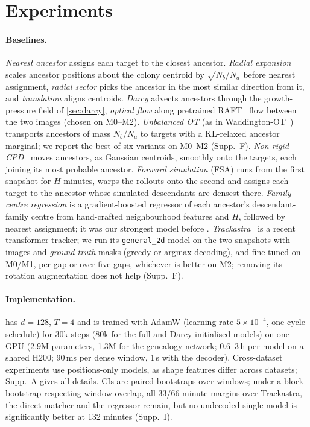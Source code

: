 \section{Experiments}
\label{sec:experiments}

\paragraph{Baselines.}
\emph{Nearest ancestor} assigns each target to the closest ancestor.
\emph{Radial expansion} scales ancestor positions about the colony centroid by $\sqrt{N_b/N_a}$ before nearest assignment, \emph{radial sector} picks the ancestor in the most similar direction from it, and \emph{translation} aligns centroids.
\emph{Darcy} advects ancestors through the growth-pressure field of \cref{sec:darcy}, \emph{optical flow} along pretrained RAFT~\cite{teed2020raft} flow between the two images (chosen on M0--M2).
\emph{Unbalanced OT} (as in Waddington-OT~\cite{schiebinger2019optimal}) transports ancestors of mass $N_b/N_a$ to targets with a KL-relaxed ancestor marginal; we report the best of six variants on M0--M2 (Supp.~F).
\emph{Non-rigid CPD}~\cite{myronenko2010cpd} moves ancestors, as Gaussian centroids, smoothly onto the targets, each joining its most probable ancestor.
\emph{Forward simulation} (FSA) runs \rodsim from the first snapshot for $H$ minutes, warps the rollouts onto the second and assigns each target to the ancestor whose simulated descendants are densest there.
\emph{Family-centre regression} is a gradient-boosted regressor of each ancestor's descendant-family centre from hand-crafted neighbourhood features and $H$, followed by nearest assignment; it was our strongest model before \ours.
\emph{Trackastra}~\cite{gallusser2024trackastra} is a recent transformer tracker; we run its \texttt{general\_2d} model on the two snapshots with images and \emph{ground-truth} masks (greedy or argmax decoding), and fine-tuned on M0/M1, per gap or over five gaps, whichever is better on M2; removing its rotation augmentation does not help (Supp.~F).

\paragraph{Implementation.}
\ours has $d{=}128$, $T{=}4$ and is trained with AdamW (learning rate $5{\times}10^{-4}$, one-cycle schedule) for 30k steps (80k for the full and Darcy-initialised models) on one GPU (2.9M parameters, 1.3M for the genealogy network; 0.6--3\,h per model on a shared H200; 90\,ms per dense window, 1\,s with the decoder).
Cross-dataset experiments use positions-only models, as shape features differ across datasets; Supp.~A gives all details.
CIs are paired bootstraps over windows; under a block bootstrap respecting window overlap, all 33/66-minute margins over Trackastra, the direct matcher and the regressor remain, but no undecoded single model is significantly better at 132 minutes (Supp.~I).

